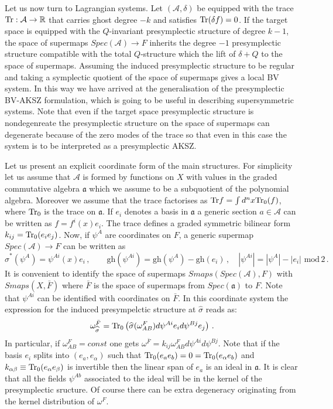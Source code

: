 \documentclass[a4paper,12pt]{article}
\numberwithin{equation}{section} %
\renewcommand{\hat}{\widehat}
\newcommand{\p}[1]{|#1|}
\newcommand{\gh}[1]{\mathrm{gh}(#1)}
\newcommand{\algA}{\mathcal{A}}
\newcommand{\fR}{\mathbb{R}}
\def\tr{{\rm Tr}}
\numberwithin{equation}{section}
\newcommand{\alga}{\mathfrak{a}}
\begin{document}
Let us now turn to Lagrangian systems. Let $(\algA,\delta)$ be equipped with the trace $\tr :\algA \to \fR$ that carries ghost degree $-k$ and satisfies $\tr(\delta f)=0$. If the target space is equipped with the
$Q$-invariant presymplectic structure of degree $k-1$, the space of supermaps $Spec(\algA) \to F$ inherits the degree $-1$ presymplectic structure compatible with the total $Q$-structure which the lift of $\delta+Q$ to the space of supermaps. Assuming the induced presymplectic structure to be regular and taking a symplectic quotient of the space of supermaps gives a local BV system. In this way we have arrived at the generalisation of the presymplectic BV-AKSZ formulation, which is going to be useful in describing supersymmetric systems.  Note that even if the target space presymplectic structure is nondegenreate the presymplectic structure on the space of supermaps can degenerate because of the zero modes of the trace so that even in this case the system is to be interpreted as a presymplectic AKSZ.  

Let us present an explicit coordinate form of the main structures. For simplicity let us assume that $\algA$ is formed by functions on $X$ with values in the graded commutative algebra $\mathfrak{a}$ which we assume to be a subquotient of the polynomial algebra.  Moreover we assume that the trace factorises as $\tr{f}=\int d^nx \tr_0(f)$, where $\tr_0$ is the trace on $\mathfrak{a}$. If $e_i$ denotes a basis in $\mathfrak{a}$ a generic section $a \in \algA$ can be written as $f=f^i(x)e_i$. The trace defines a graded symmetric bilinear form $k_{ij}=\tr_0(e_ie_j)$. Now, if $\psi^A$ are coordinates on $F$, a generic supermap $Spec(\algA) \to F$ can be written as
\begin{equation}
\hat\sigma^\ast(\psi^A)=\psi^{Ai}(x)e_i\,, \qquad \gh{\psi^{Ai}}=\gh{\psi^A}-\gh{e_i}\,, \quad \p{\psi^{Ai}}=\p{\psi^A}-\p{e_i}\,\, \mathrm{mod} \,2 \,.
\end{equation}
It is convenient to identify the space of supermaps $Smaps(Spec(\algA),F)$ with $Smaps(X,\bar F)$ where $\bar F$ is the space of supermaps from $Spec(\mathfrak{a})$ to $F$. Note that $\psi^{Ai}$ can be identified with coordinates on $\bar F$. In this coordinate system the expression for the induced presympelctic structure at $\hat\sigma$ reads as:
\begin{equation}
\omega^{\bar F}_{\hat\sigma}=\tr_0\left(\hat\sigma(\omega^F_{AB}) d\psi^{Ai}e_i d\psi^{Bj}e_j\right)\,.
\end{equation}
In particular, if $\omega^F_{AB}=const$ one gets $\omega^{\bar F}=k_{ij}\omega^F_{AB}d\psi^{Ai} d\psi^{Bj} $. Note that if the basis $e_i$ splits into $(e_a,e_\alpha)$ such that $\tr_0(e_ae_b)=0=\tr_0(e_\alpha e_b)$ and
$k_{\alpha\beta}\equiv \tr_0(e_\alpha e_\beta)$ is invertible then the linear span of $e_a$ is an ideal in $\alga$. It is clear that all the fields $\psi^{Ab}$ associated to the ideal will be in the kernel of the presymplectic sructure. Of course there can be extra degeneracy originating from the kernel distribution of $\omega^F$.
\end{document}
